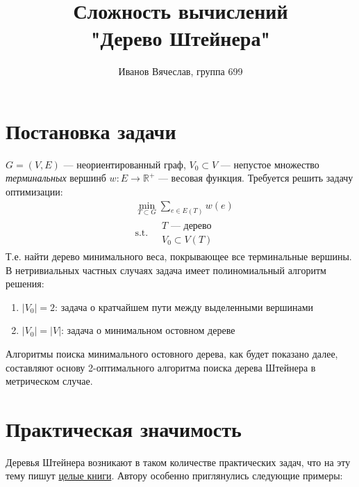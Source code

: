 \documentclass[11pt,a4paper]{report}
\title{Сложность вычислений\\"Дерево Штейнера"}
\author{Иванов Вячеслав, группа 699}
\def\Real{\mathbb{R}}
\theoremstyle{definition}
\theoremstyle{definition}
\theoremstyle{definition}
\begin{document}
	\setlength{\parindent}{1cm}
	{\let\newpage\relax\maketitle}
	\tableofcontents
	\newpage 
	\section{Постановка задачи}
		 $G = (V, E)$ — неориентированный граф, $V_0 \subset V$ — непустое множество \textit{терминальных} вершинб $w : E \to \Real^{+}$ — весовая функция. Требуется решить задачу оптимизации:
		\begin{align*}
			&\min_{T \subset G} \sum_{e \in E(T)} w(e)\\
			&\text{s.t.}\ 
			\begin{aligned}
				&T \text{ — дерево}\\
				&V_0 \subset V(T)			
			\end{aligned}
		\end{align*}
		Т.е. найти дерево минимального веса, покрывающее все терминальные вершины.\\
		В нетривиальных частных случаях задача имеет полиномиальный алгоритм решения:
		\begin{enumerate}
			\item $|V_0| = 2$: задача о кратчайшем пути между выделенными вершинами
			\item $|V_0| = |V|$: задача о минимальном остовном дереве
		\end{enumerate}
		Алгоритмы поиска минимального остовного дерева, как будет показано далее, составляют основу 2-оптимального алгоритма поиска дерева Штейнера в метрическом случае.
	\section{Практическая значимость}
		Деревья Штейнера возникают в таком количестве практических задач, что на эту тему пишут \href{https://www.springer.com/gp/book/9781402000997}{целые книги}. Автору особенно приглянулись следующие примеры:
\end{document}
